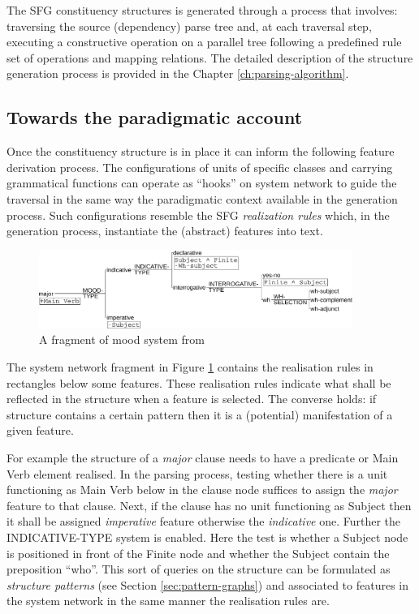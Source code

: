 The SFG constituency structures is generated through a process that involves: traversing the source (dependency) parse tree and, at each traversal step, executing a constructive operation on a parallel tree following a predefined rule set of operations and mapping relations. The detailed description of the structure generation process is provided in the Chapter \ref{ch:parsing-algorithm}. 


\subsection{Towards the paradigmatic account}

Once the constituency structure is in place it can inform the following feature derivation process. The configurations of units of specific classes and carrying grammatical functions can operate as ``hooks'' on system network to guide the traversal in the same way the paradigmatic context available in the generation process. Such configurations resemble the SFG \textit{realization rules} which, in the generation process, instantiate the (abstract) features into text. 

\begin{figure}[!ht]
    \centering      
    \includegraphics[width=0.91\textwidth]{Figures/Example/just-mood.pdf}      
    \caption{A fragment of mood system from \citet[366]{Halliday2013}}
    \label{fig:just-mood}
\end{figure}

The system network fragment in Figure \ref{fig:just-mood} contains the realisation rules in rectangles below some features. These realisation rules indicate what shall be reflected in the structure when a feature is selected. The converse holds: if structure contains a certain pattern then it is a (potential) manifestation of a given feature. 

For example the structure of a \textit{major} clause needs to have a predicate or Main Verb element realised. In the parsing process, testing whether there is a unit functioning as Main Verb below in the clause node suffices to assign the \textit{major} feature to that clause. Next, if the clause has no unit functioning as Subject then it shall be assigned \textit{imperative} feature otherwise the \textit{indicative} one. Further the INDICATIVE-TYPE system is enabled. Here the test is whether a Subject node is positioned in front of the Finite node and whether the Subject contain the preposition ``who''. This sort of queries on the structure can be formulated as \textit{structure patterns} (see Section \ref{sec:pattern-graphs}) and associated to features in the system network in the same manner the realisation rules are. 

